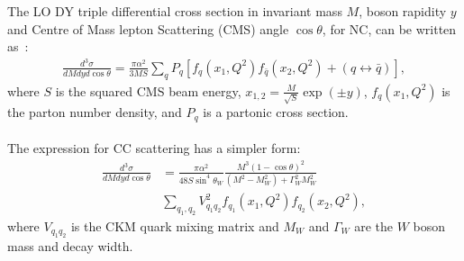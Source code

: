 The LO DY triple differential cross section in
invariant mass \(M\), boson rapidity \(y\) and Centre of Mass 
lepton Scattering (CMS) angle \(\cos\theta\), for NC, 
can be written as~\cite{Drell:1970wh,Yamada:1981mw}:
\begin{align}
 \textstyle
 \frac{d^3\sigma}{dM{d}y d\cos\theta} =  
 \frac{\pi\alpha^2}{3MS}\sum_{q}P_q \left[f_q(x_1,Q^2)f_{\bar{q}}(x_2,Q^2) 
 + (q\leftrightarrow\bar{q})\right],
\end{align}
where \(S\) is the squared CMS beam energy, \(x_{1,2} = \frac{M}{\sqrt{S}}\exp(\pm y)\), $f_q(x_1,Q^2)$ 
is the parton number density, and 
$P_q$ is a partonic cross section. 
%
\\
\\
The expression for CC  scattering has a simpler form:
\begin{align}
\frac{d^3\sigma}{dMdyd\cos\theta} &=
 \frac{\pi\alpha^2}{48S\sin^4\theta_W}
 \frac{M^3(1-\cos\theta)^2}{(M^2-M_W^2)+\Gamma_W^2M_W^2}  \nonumber \\
 & \sum_{q_1,q_2}V_{q_1q_2}^2f_{q_1}(x_1,Q^2)f_{q_2}(x_2,Q^2),
\end{align}
where \(V_{q_1q_2}\) is the CKM quark mixing matrix and \(M_W\) and \(\Gamma_W\)
are the \(W\) boson mass and decay width.

